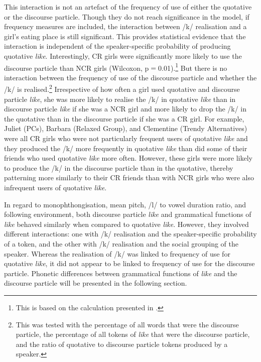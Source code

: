 This interaction is not an artefact of the frequency of use of either the quotative or the discourse particle. Though they do not reach significance in the model, if frequency measures are included, the interaction between /k/ realisation and a girl's eating place is still significant. This provides statistical evidence that the interaction is independent of the speaker-specific probability of producing quotative \textit{like}. Interestingly, CR girls were significantly more likely to use the discourse particle than NCR girls (Wilcoxon, p$=$0.01).\footnote{This is based on the calculation presented in .} But there is no interaction between the frequency of use of the discourse particle and whether the /k/ is realised.\footnote{This was tested with the percentage of all words that were the discourse particle, the percentage of all tokens of \textit{like} that were the discourse particle, and the ratio of quotative to discourse particle tokens produced by a speaker.} Irrespective of how often a girl used quotative and discourse particle \textit{like}, she was more likely to realise the /k/ in quotative \textit{like} than in discourse particle \textit{like} if she was a NCR girl and more likely to drop the /k/ in the quotative than in the discourse particle if she was a CR girl. For example, Juliet (PCs), Barbara (Relaxed Group), and Clementine (Trendy Alternatives) were all CR girls who were not particularly frequent users of quotative \textit{like} and they produced the /k/ more frequently in quotative \textit{like} than did some of their friends who used quotative \textit{like} more often. However, these girls were more likely to produce the /k/ in the discourse particle than in the quotative, thereby patterning more similarly to their CR friends than with NCR girls who were also infrequent users of quotative \textit{like}. 






In regard to monophthongisation, mean pitch, /l/ to vowel duration ratio, and following environment, both discourse particle \textit{like} and grammatical functions of \textit{like} behaved similarly when compared to quotative \textit{like}. However, they involved different interactions: one with /k/ realisation and the speaker-specific probability of a token, and the other with /k/ realisation and the social grouping of the speaker. Whereas the realisation of /k/ was linked to frequency of use for quotative \textit{like}, it did not appear to be linked to frequency of use for the discourse particle. Phonetic differences between grammatical functions of \textit{like} and the discourse particle will be presented in the following section.

